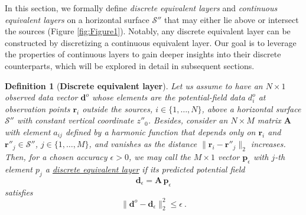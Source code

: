 \documentclass[manuscript,noblind]{geophysics}
\newtheorem{definition}{Definition}
\begin{document}
	In this section, we formally define \textit{discrete equivalent layers} and \textit{continuous equivalent layers} 
	on a horizontal surface $\mathcal{S}''$ that may either lie above or intersect the sources (Figure \ref{fig:Figure1}). 
	Notably, any discrete equivalent layer can be constructed by discretizing a continuous equivalent layer.
	Our goal is to leverage the properties of continuous layers to gain deeper insights into their discrete counterparts, 
	which will be explored in detail in subsequent sections.
	
	\begin{definition}[\textbf{Discrete equivalent layer}]
		Let us assume to have an $N \times 1$ observed data vector $\mathbf{d}^{o}$ whose elements 
		are the potential-field data $d^{o}_{i}$ at observation points $\mathbf{r}_{i}$ outside the sources, 
		$i \in \{1, \dots, N\}$, above a horizontal surface $\mathcal{S}''$ with constant vertical 
		coordinate $z''_{0}$. Besides, consider an $N \times M$ 
		matrix $\mathbf{A}$ with element $a_{ij}$ defined by a harmonic function that depends only on $\mathbf{r}_{i}$ 
		and $\mathbf{r}''_{j} \in \mathcal{S}''$, $j \in \{1, \dots, M\}$, and
		vanishes as the distance $\| \mathbf{r}_{i} - \mathbf{r}''_{j} \|_{2}$ increases. 
		Then, for a chosen accuracy $\epsilon > 0$, we may call the $M \times 1$ vector $\mathbf{p}_{\epsilon}$ with $j$-th element $p_{j}$ 
		a \underline{discrete equivalent layer} if its predicted potential field 
		\begin{equation}
			\mathbf{d}_{\epsilon} = \mathbf{A} \, \mathbf{p}_{\epsilon}
			\label{eq:predicted-data-discrete-layer}
		\end{equation}
		satisfies 
		\begin{equation}
			\| \mathbf{d}^{o} - \mathbf{d}_{\epsilon} \|_{2}^{2} \le \epsilon \: .
			\label{eq:epsilon-bound-data-discrete}
		\end{equation}
		\label{def:discrete-eqlayer}
	\end{definition}
	
\end{document}
